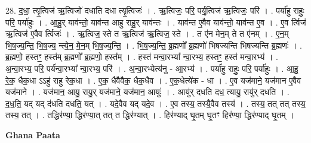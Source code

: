 \documentclass[17pt]{extarticle}
\begin{document}
28. द॒धा॒ त्यृ॒त्विज॑ ऋ॒त्विजो॑ दधाति दधा त्यृ॒त्विजः॑ । . ऋ॒त्विजः॒ परि॒ पर्यृ॒त्विज॑ ऋ॒त्विजः॒ परि॑ । . पर्या॑हु राहुः॒ परि॒ पर्या॑हुः । . आ॒हु॒र् याव॑न्तो॒ याव॑न्त आहु राहु॒र् याव॑न्तः । . याव॑न्त ए॒वैव याव॑न्तो॒ याव॑न्त ए॒व । . ए॒व र्त्विज॑ ऋ॒त्विज॑ ए॒वैव र्त्विजः॑ । . ऋ॒त्विज॒ स्ते त ऋ॒त्विज॑ ऋ॒त्विज॒ स्ते । . त ए॑न मेन॒म् ते त ए॑नम् । . ए॒न॒म् भि॒ष॒ज्य॒न्ति॒ भि॒ष॒ज्य॒ न्त्ये॒न॒ मे॒न॒म् भि॒ष॒ज्य॒न्ति॒ । . भि॒ष॒ज्य॒न्ति॒ ब्र॒ह्मणो᳚ ब्र॒ह्मणो॑ भिषज्यन्ति भिषज्यन्ति ब्र॒ह्मणः॑ । . ब्र॒ह्मणो॒ हस्तꣳ॒॒ हस्त॑म् ब्र॒ह्मणो᳚ ब्र॒ह्मणो॒ हस्त᳚म् । . हस्त॑ मन्वा॒रभ्या᳚ न्वा॒रभ्य॒ हस्तꣳ॒॒ हस्त॑ मन्वा॒रभ्य॑ । . अ॒न्वा॒रभ्य॒ परि॒ पर्य॑न्वा॒रभ्या᳚ न्वा॒रभ्य॒ परि॑ । . अ॒न्वा॒रभ्येत्य॑नु - आ॒रभ्य॑ । . पर्या॑हु राहुः॒ परि॒ पर्या॑हुः । . आ॒हु॒ रे॒क॒ धैक॒धा ऽऽहु॑ राहु रेक॒धा । . ए॒क॒ धैवैवैक॒ धैक॒धैव । . ए॒क॒धेत्ये॑क - धा । . ए॒व यज॑माने॒ यज॑मान ए॒वैव यज॑माने । . यज॑मान॒ आयु॒ रायु॒र् यज॑माने॒ यज॑मान॒ आयुः॑ । . आयु॑र् दधति दध॒ त्यायु॒ रायु॑र् दधति । . द॒ध॒ति॒ यद् यद् द॑धति दधति॒ यत् । . यदे॒वैव यद् यदे॒व । . ए॒व तस्य॒ तस्यै॒वैव तस्य॑ । . तस्य॒ तत् तत् तस्य॒ तस्य॒ तत् । . तद्धिर॑ण्या॒ द्धिर॑ण्या॒त् तत् त द्धिर॑ण्यात् । . हिर॑ण्याद् घृ॒तम् घृ॒तꣳ हिर॑ण्या॒ द्धिर॑ण्याद् घृ॒तम् । \newline

\textbf{Ghana Paata } \newline
\end{document}
